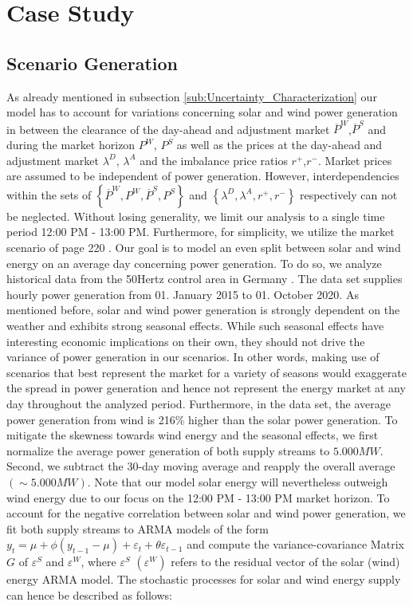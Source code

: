 
\section{Case Study}

\subsection{Scenario Generation}
As already mentioned in subsection \ref{sub:Uncertainty_Characterization} our model has to account for variations concerning solar and wind power generation in between the clearance of the day-ahead and adjustment market $\overline{P}^{W}$,$\overline{P}^{S}$ and during the market horizon ${P}^{W}$, ${P}^{S}$ as well as the prices at the day-ahead and adjustment market $\lambda^D$, $\lambda^A$ and the imbalance price ratios $r^+$,$r^-$. Market prices are assumed to be independent of power generation. However, interdependencies within the sets of $\left\lbrace\overline{P}^{W},{P}^{W},\overline{P}^{S},{P}^{S}\right\rbrace$ and $\left\lbrace\lambda^D,\lambda^A,r^+,r^-\right\rbrace$ respectively can not be neglected. Without losing generality, we limit our analysis to a single time period 12:00 PM - 13:00 PM. Furthermore, for simplicity, we utilize the market scenario of page 220 \cite{Conejo10}. %
Our goal is to model an even split between solar and wind energy on an average day concerning power generation. To do so, we analyze historical data from the 50Hertz control area in Germany  \cite{url}. The data set supplies hourly power generation from 01. January 2015 to 01. October 2020. As mentioned before, solar and wind power generation is strongly dependent on the weather and exhibits strong seasonal effects. While such seasonal effects have interesting economic implications on their own, they should not drive the variance of power generation in our scenarios. In other words, making use of scenarios that best represent the market for a variety of seasons would exaggerate the spread in power generation and hence not represent the energy market at any day throughout the analyzed period. Furthermore, in the data set, the average power generation from wind is 216\% higher than the solar power generation. To mitigate the skewness towards wind energy and the seasonal effects, we first normalize the average power generation of both supply streams to $5.000 MW$. Second, we subtract the 30-day moving average and reapply the overall average $\left(\sim 5.000 MW\right)$. Note that our model solar energy will nevertheless outweigh wind energy due to our focus on the 12:00 PM - 13:00 PM market horizon. To account for the negative correlation between solar and wind power generation, we fit both supply streams to ARMA models of the form $y_t = \mu + \phi \left(y_{t-1}-\mu\right)+\varepsilon_t + \theta\varepsilon_{t-1}$ and compute the variance-covariance Matrix $G$ of $\varepsilon^S$ and $\varepsilon^W$, where $\varepsilon^S$ $\left(\varepsilon^W\right)$ refers to the residual vector of the solar (wind) energy ARMA model. The stochastic processes 
for solar and wind energy supply can hence be described as follows:


